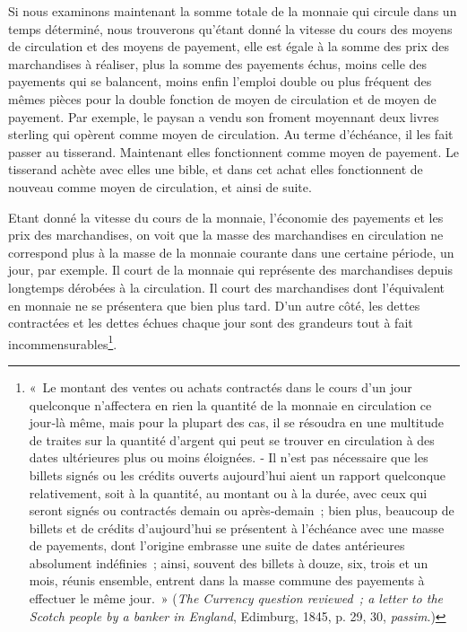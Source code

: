 \documentclass[french,twoside]{book} %
\begin{document}
Si nous examinons maintenant la somme totale de la monnaie qui circule dans un temps déterminé, nous trouverons qu’étant donné la vitesse du cours des moyens de circulation et des moyens de payement, elle est égale à la somme des prix des marchandises à réaliser, plus la somme des payements échus, moins celle des payements qui se balancent, moins enfin l’emploi double ou plus fréquent des mêmes pièces pour la double fonction de moyen de circulation et de moyen de payement. Par exemple, le paysan a vendu son froment moyennant deux livres sterling qui opèrent comme moyen de circulation. Au terme d’échéance, il les fait passer au tisserand. Maintenant elles fonctionnent comme moyen de payement. Le tisserand achète avec elles une bible, et dans cet achat elles fonctionnent de nouveau comme moyen de circulation, et ainsi de suite.\par
Etant donné la vitesse du cours de la monnaie, l’économie des payements et les prix des marchandises, on voit que la masse des marchandises en circulation ne correspond plus à la masse de la monnaie courante dans une certaine période, un jour, par exemple. Il court de la monnaie qui représente des marchandises depuis longtemps dérobées à la circulation. Il court des marchandises dont l’équivalent en monnaie ne se présentera que bien plus tard. D’un autre côté, les dettes contractées et les dettes échues chaque jour sont des grandeurs tout à fait incommensurables\footnote{ \noindent « Le montant des ventes ou achats contractés dans le cours d’un jour quelconque n’affectera en rien la quantité de la monnaie en circulation ce jour‑là même, mais pour la plupart des cas, il se résoudra en une multitude de traites sur la quantité d’argent qui peut se trouver en circulation à des dates ultérieures plus ou moins éloignées. ‑ Il n’est pas nécessaire que les billets signés ou les crédits ouverts aujourd’hui aient un rapport quelconque relativement, soit à la quantité, au montant ou à la durée, avec ceux qui seront signés ou contractés demain ou après‑demain ; bien plus, beaucoup de billets et de crédits d’aujourd’hui se présentent à l’échéance avec une masse de payements, dont l’origine embrasse une suite de dates antérieures absolument indéfinies ; ainsi, souvent des billets à douze, six, trois et un mois, réunis ensemble, entrent dans la masse commune des payements à effectuer le même jour. » (\emph{The Currency question reviewed ; a letter to the Scotch people by a banker in England}, Edimburg, 1845, p. 29, 30, \emph{passim}.)
 }.\par
\end{document}
